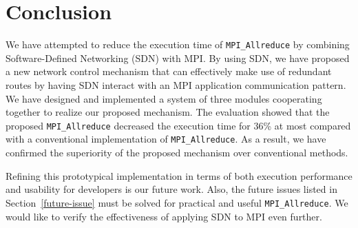 \hypertarget{conclusion}{%
\section{Conclusion}\label{conclusion}}

We have attempted to reduce the execution time of
\texttt{MPI\_Allreduce} by combining Software-Defined Networking (SDN)
with MPI\@. By using SDN, we have proposed a new network control mechanism
that can effectively make use of redundant routes by having SDN interact
with an MPI application communication pattern. We have designed and
implemented a system of three modules cooperating together to realize
our proposed mechanism. The evaluation showed that the proposed
\texttt{MPI\_Allreduce} decreased the execution time for 36\% at most
compared with a conventional implementation of \texttt{MPI\_Allreduce}.
As a result, we have confirmed the superiority of the proposed mechanism
over conventional methods.

Refining this prototypical implementation in terms of both execution
performance and usability for developers is our future work. Also, the
future issues listed in Section~\ref{future-issue} must be solved for
practical and useful \texttt{MPI\_Allreduce}. We would like to verify
the effectiveness of applying SDN to MPI even further.
